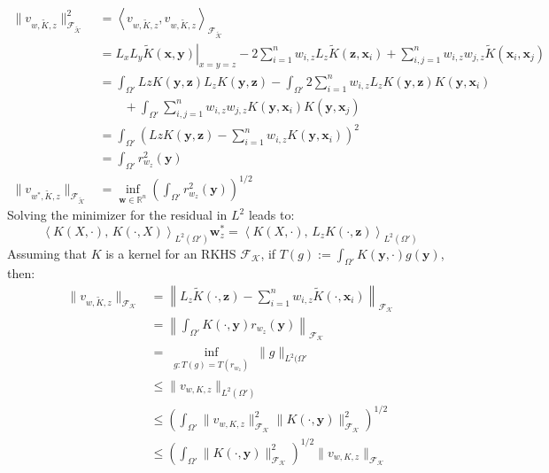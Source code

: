 \documentclass[11pt]{article}
\begin{document}
\begin{align*}
	\| v_{w,\tilde{K},z} \|^2_{\mathcal{F_{\tilde{K}}}} &= \left \langle v_{w,\tilde{K},z}, v_{w,\tilde{K},z} \right \rangle_{\mathcal{F_{\tilde{K}}}}\\
	&= \left. L_x L_y \tilde{K}(\bm{x}, \bm{y}) \right|_{x=y=z} - 2 \sum_{i=1}^n w_{i,z} L_z \tilde{K}(\bm{z}, \bm{x}_i) + \sum_{i,j=1}^n w_{i,z} w_{j,z} \tilde{K}(\bm{x}_i, \bm{x}_j)\\
	&= \int_{\Omega'} Lz K(\bm{y},\bm{z}) L_z K(\bm{y}, \bm{z}) - \int_{\Omega'} 2 \sum_{i=1}^n w_{i,z} L_z K(\bm{y}, \bm{z}) K(\bm{y}, \bm{x}_i) \\ & \qquad + \int_{\Omega'} \sum_{i,j=1}^n w_{i,z} w_{j,z} K(\bm{y}, \bm{x}_i) K(\bm{y}, \bm{x}_j)\\
	&= \int_{\Omega'} \left ( Lz K(\bm{y},\bm{z}) - \sum_{i=1}^n w_{i,z} K(\bm{y}, \bm{x}_i) \right)^2\\
	&= \int_{\Omega'} r_{w_z}^2(\bm{y})\\
	\| v_{w^*,\tilde{K},z} \|_{\mathcal{F_{\tilde{K}}}} &= \inf_{\bm{w}\in \mathbb{R}^n} \left( \int_{\Omega'} r_{w_z}^2(\bm{y}) \right)^{1/2}
\end{align*}
Solving the minimizer for the residual in $L^2$ leads to:
\begin{equation}
	\left \langle K(X,\cdot), \, K(\cdot, X) \right \rangle_{L^2(\Omega')} \bm{w}_z^* = \left \langle K(X, \cdot), \, L_z K(\cdot, \bm{z}) \right \rangle_{L^2(\Omega')}
\end{equation}
Assuming that $K$ is a kernel for an RKHS $\mathcal{F_K}$, if $T(g) := \int_{\Omega'} K(\bm{y}, \cdot) g(\bm{y})$, then:
\begin{align*}
	\| v_{w,\tilde{K},z} \|_{\mathcal{F_{K}}} &= \left \| L_z \tilde{K}(\cdot, \bm{z}) - \sum_{i=1}^n w_{i,z} \tilde{K}(\cdot, \bm{x}_i) \right \|_{\mathcal{F_{K}}}\\
	&= \left \| \int_{\Omega'} K(\cdot, \bm{y}) r_{w_z}(\bm{y}) \right \|_{\mathcal{F_{K}}}\\
	&= \inf_{\substack{g: T(g)=T(r_{w_z})}} \| g \|_{L^2(\Omega'}\\
	&\le \| v_{w,K,z} \|_{L^2(\Omega')}\\
	&\le \left( \int_{\Omega'} \| v_{w,K,z} \|^2_{\mathcal{F_{K}}} \| K(\cdot,\bm{y}) \|^2_{\mathcal{F_{K}}} \right)^{1/2}\\
	&\le \left( \int_{\Omega'} \| K(\cdot,\bm{y}) \|^2_{\mathcal{F_{K}}} \right)^{1/2} \| v_{w,K,z} \|_{\mathcal{F_{K}}}
\end{align*}

\end{document}
